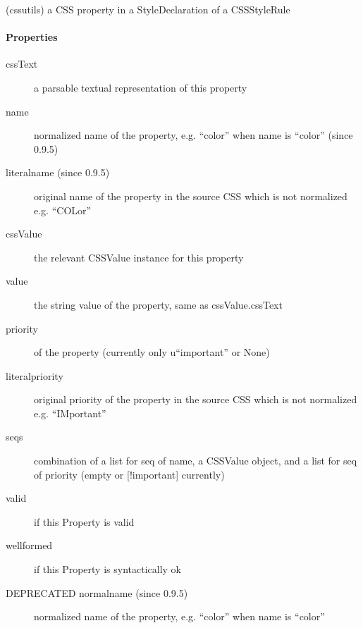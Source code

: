 (cssutils) a CSS property in a StyleDeclaration of a CSSStyleRule



\hypertarget{properties}{}
\paragraph*{Properties}
\label{properties}
\begin{description}
\item[{cssText}] \leavevmode 
a parsable textual representation of this property

\item[{name}] \leavevmode 
normalized name of the property, e.g. ``color'' when name is ``color''
(since 0.9.5)

\item[{literalname (since 0.9.5)}] \leavevmode 
original name of the property in the source CSS which is not normalized
e.g. ``COLor''

\item[{cssValue}] \leavevmode 
the relevant CSSValue instance for this property

\item[{value}] \leavevmode 
the string value of the property, same as cssValue.cssText

\item[{priority}] \leavevmode 
of the property (currently only u``important'' or None)

\item[{literalpriority}] \leavevmode 
original priority of the property in the source CSS which is not
normalized e.g. ``IMportant''

\item[{seqs}] \leavevmode 
combination of a list for seq of name, a CSSValue object, and
a list for seq of  priority (empty or {[}!important{]} currently)

\item[{valid}] \leavevmode 
if this Property is valid

\item[{wellformed}] \leavevmode 
if this Property is syntactically ok

\item[{DEPRECATED normalname (since 0.9.5)}] \leavevmode 
normalized name of the property, e.g. ``color'' when name is ``color''

\end{description}



